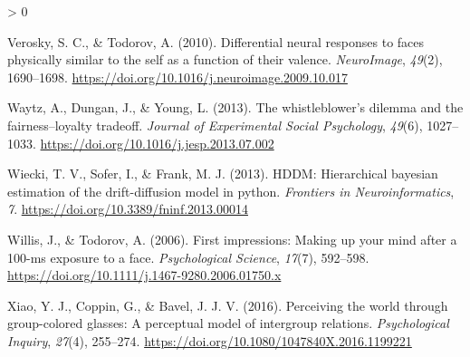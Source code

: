 \documentclass[
  english,
  man]{apa6}
\newlength{\cslhangindent}
\newenvironment{CSLReferences}[2] %
 {%
  \setlength{\parindent}{0pt}
  \ifodd #1 \everypar{\setlength{\hangindent}{\cslhangindent}}\ignorespaces\fi
  \ifnum #2 > 0
  \setlength{\parskip}{#2\baselineskip}
  \fi
 }%
 {}
\begin{document}
\begin{CSLReferences}{1}{0}
\leavevmode\hypertarget{ref-verosky_differential_2010}{}%
Verosky, S. C., \& Todorov, A. (2010). Differential neural responses to faces physically similar to the self as a function of their valence. \emph{{NeuroImage}}, \emph{49}(2), 1690--1698. \url{https://doi.org/10.1016/j.neuroimage.2009.10.017}

\leavevmode\hypertarget{ref-waytz_whistleblowers_2013}{}%
Waytz, A., Dungan, J., \& Young, L. (2013). The whistleblower's dilemma and the fairness--loyalty tradeoff. \emph{Journal of Experimental Social Psychology}, \emph{49}(6), 1027--1033. \url{https://doi.org/10.1016/j.jesp.2013.07.002}

\leavevmode\hypertarget{ref-wiecki_hddm_2013}{}%
Wiecki, T. V., Sofer, I., \& Frank, M. J. (2013). {HDDM}: Hierarchical bayesian estimation of the drift-diffusion model in python. \emph{Frontiers in Neuroinformatics}, \emph{7}. \url{https://doi.org/10.3389/fninf.2013.00014}

\leavevmode\hypertarget{ref-willis_first_2006}{}%
Willis, J., \& Todorov, A. (2006). First impressions: Making up your mind after a 100-ms exposure to a face. \emph{Psychological Science}, \emph{17}(7), 592--598. \url{https://doi.org/10.1111/j.1467-9280.2006.01750.x}

\leavevmode\hypertarget{ref-xiao_perceiving_2016}{}%
Xiao, Y. J., Coppin, G., \& Bavel, J. J. V. (2016). Perceiving the world through group-colored glasses: A perceptual model of intergroup relations. \emph{Psychological Inquiry}, \emph{27}(4), 255--274. \url{https://doi.org/10.1080/1047840X.2016.1199221}

\end{CSLReferences}

\endgroup
\end{document}
